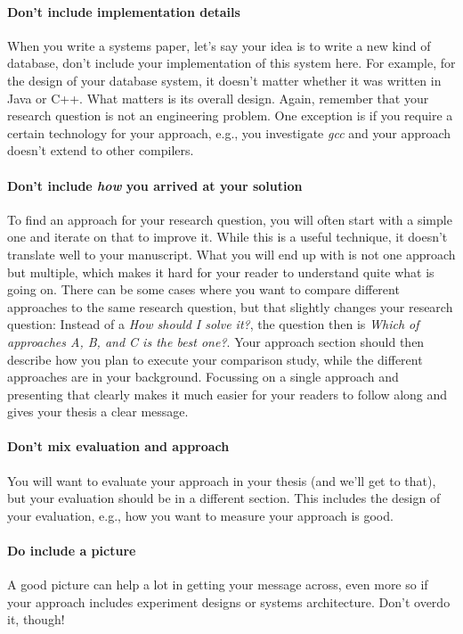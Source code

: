 \documentclass[a4]{article}
\begin{document}
\paragraph{Don't include implementation details}
When you write a systems paper, let's say your idea is to write a new kind of database, don't include your implementation of this system here.
For example, for the design of your database system, it doesn't matter whether it was written in Java or C++.
What matters is its overall design.
Again, remember that your research question is not an engineering problem.
One exception is if you require a certain technology for your approach, e.g., you investigate \emph{gcc} and your approach doesn't extend to other compilers.

\paragraph{Don't include \emph{how} you arrived at your solution}
To find an approach for your research question, you will often start with a simple one and iterate on that to improve it.
While this is a useful technique, it doesn't translate well to your manuscript.
What you will end up with is not one approach but multiple, which makes it hard for your reader to understand quite what is going on.
There can be some cases where you want to compare different approaches to the same research question, but that slightly changes your research question:
Instead of a \emph{How should I solve it?}, the question then is \emph{Which of approaches A, B, and C is the best one?}.
Your approach section should then describe how you plan to execute your comparison study, while the different approaches are in your background.
Focussing on a single approach and presenting that clearly makes it much easier for your readers to follow along and gives your thesis a clear message.

\paragraph{Don't mix evaluation and approach}
You will want to evaluate your approach in your thesis (and we'll get to that), but your evaluation should be in a different section.
This includes the design of your evaluation, e.g., how you want to measure your approach is good.

\paragraph{Do include a picture}
A good picture can help a lot in getting your message across, even more so if your approach includes experiment designs or systems architecture.
Don't overdo it, though!
\end{document}
